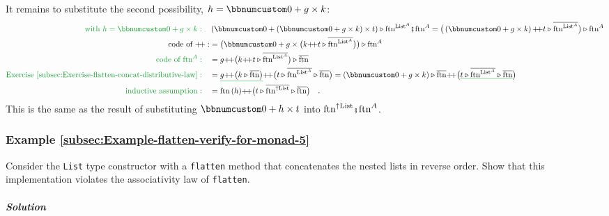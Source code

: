 It remains to substitute the second possibility, $h=\bbnum 0+g\times k$:
\begin{align*}
{\color{greenunder}\text{with }h=\bbnum 0+g\times k:}\quad & \left(\bbnum 0+\left(\bbnum 0+g\times k\right)\times t\right)\triangleright\text{ftn}^{\text{List}^{A}}\bef\text{ftn}^{A}=\big(\left(\bbnum 0+g\times k\right)\pplus t\triangleright\overline{\text{ftn}^{\text{List}^{A}}}\big)\triangleright\text{ftn}^{A}\\
\text{code of }\pplus: & =\big(\bbnum 0+g\times\big(k\pplus t\triangleright\overline{\text{ftn}^{\text{List}^{A}}}\big)\big)\triangleright\text{ftn}^{A}\\
{\color{greenunder}\text{code of }\text{ftn}^{A}:}\quad & =g\pplus\big(k\pplus t\triangleright\overline{\text{ftn}^{\text{List}^{A}}}\big)\triangleright\overline{\text{ftn}}\\
{\color{greenunder}\text{Exercise~\ref{subsec:Exercise-flatten-concat-distributive-law}}:}\quad & =\gunderline{g\pplus\big(k\triangleright\overline{\text{ftn}}\big)}\pplus\big(t\triangleright\overline{\text{ftn}^{\text{List}^{A}}}\triangleright\overline{\text{ftn}}\big)=\left(\bbnum 0+g\times k\right)\triangleright\overline{\text{ftn}}\pplus\big(\gunderline{t\triangleright\overline{\text{ftn}^{\text{List}^{A}}}\triangleright\overline{\text{ftn}}}\big)\\
{\color{greenunder}\text{inductive assumption}:}\quad & =\text{ftn}\,(h)\pplus\big(t\triangleright\overline{\text{ftn}^{\uparrow\text{List}}}\triangleright\overline{\text{ftn}}\big)\quad.
\end{align*}
This is the same as the result of substituting $\bbnum 0+h\times t$
into $\text{ftn}^{\uparrow\text{List}}\bef\text{ftn}^{A}$.

\subsubsection{Example \label{subsec:Example-flatten-verify-for-monad-5}\ref{subsec:Example-flatten-verify-for-monad-5}}

Consider the \lstinline!List! type constructor with a \lstinline!flatten!
method that concatenates the nested lists in reverse order. Show that
this implementation violates the associativity law of \lstinline!flatten!.

\subparagraph{Solution}


